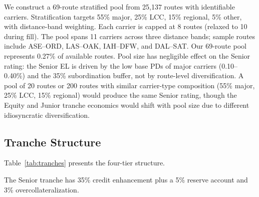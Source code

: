 \documentclass[12pt,a4paper]{article}
\begin{document}
We construct a 69-route stratified pool from 25,137 routes with identifiable carriers. Stratification targets 55\% major, 25\% LCC, 15\% regional, 5\% other, with distance-band weighting. Each carrier is capped at 8 routes (relaxed to 10 during fill). The pool spans 11 carriers across three distance bands; sample routes include ASE--ORD, LAS--OAK, IAH--DFW, and DAL--SAT. Our 69-route pool represents 0.27\% of available routes. Pool size has negligible effect on the Senior rating: the Senior EL is driven by the low base PDs of major carriers (0.10--0.40\%) and the 35\% subordination buffer, not by route-level diversification. A pool of 20 routes or 200 routes with similar carrier-type composition (55\% major, 25\% LCC, 15\% regional) would produce the same Senior rating, though the Equity and Junior tranche economics would shift with pool size due to different idiosyncratic diversification.

\subsection{Tranche Structure}

Table~\ref{tab:tranches} presents the four-tier structure.

\begin{table}[H]
\centering
\caption{Flight FSR Tranche Structure}
\label{tab:tranches}
\end{table}

The Senior tranche has 35\% credit enhancement plus a 5\% reserve account and 3\% overcollateralization.
\end{document}
